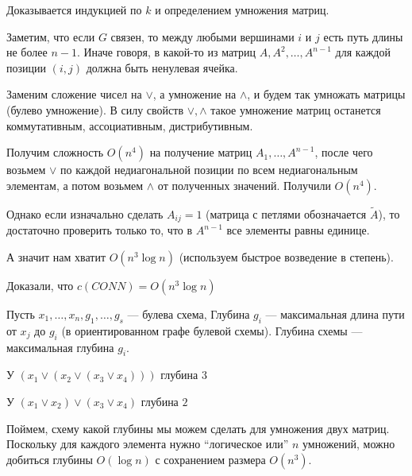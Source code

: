 Доказывается индукцией по \( k \) и определением умножения матриц.

Заметим, что если \( G \) связен, то между любыми вершинами \( i \) и \( j \) есть путь длины не более \( n - 1 \).
Иначе говоря, в какой-то из матриц \( A, A^2, \ldots, A^{n - 1} \) для каждой позиции \( (i, j) \) должна быть ненулевая ячейка.

Заменим сложение чисел на \( \lor \), а умножение на \( \land \),
и будем так умножать матрицы (булево умножение).
В силу свойств \( \lor, \land \) такое умножение матриц останется коммутативным, ассоциативным, дистрибутивным.

Получим сложность \( O(n^4) \) на получение матриц \( A_1, \ldots, A^{n - 1} \),
после чего возьмем \( \lor \) по каждой недиагональной позиции по всем недиагональным элементам,
а потом возьмем \( \land \) от полученных значений.
Получили \( O(n^4) \).

Однако если изначально сделать \( A_{ij} = 1 \) (матрица с петлями обозначается \( \tilde{A} \)),
то достаточно проверить только то, что в \( A^{n - 1} \) все элементы равны единице.

А значит нам хватит \( O(n^3 \log n) \) (используем быстрое возведение в степень).

Доказали, что \( c(CONN) = O(n^3 \log n) \)


\begin{defn}{}{}
    Пусть \( x_1, \ldots, x_n, g_1, \ldots, g_s \) --- булева схема,
    Глубина \( g_i \) --- максимальная длина пути от \( x_j \) до \( g_i \)
    (в ориентированном графе булевой схемы).
    Глубина схемы --- максимальная глубина \( g_i \).
\end{defn}

\begin{example}{}{}
    У \( (x_1 \lor (x_2 \lor (x_3 \lor x_4))) \) глубина \( 3 \)

    У \( (x_1 \lor x_2) \lor (x_3 \lor x_4) \) глубина \( 2 \)
\end{example}


Поймем, схему какой глубины мы можем сделать для умножения двух матриц.
Поскольку для каждого элемента нужно ``логическое или'' \( n \) умножений,
можно добиться глубины \( O(\log n) \) с сохранением размера \( O(n^3) \).

